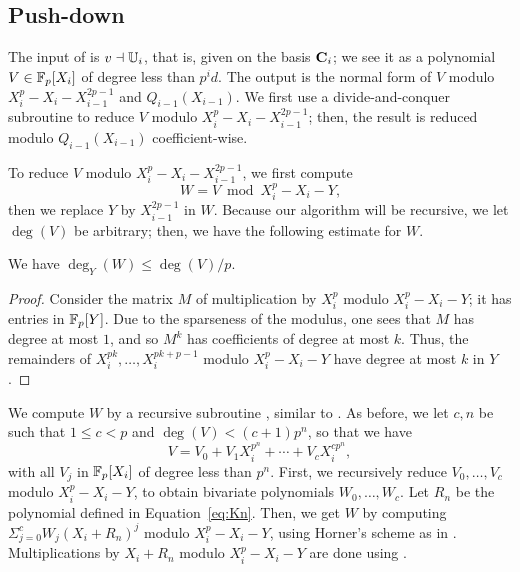 
\subsection{Push-down}\label{sec:level-embedding:push-down}

The input of \hyperref[alg:push-down]{} is $v \dashv \mathbb{U}_i$, that is, given on the
basis $\mathbf{C}_i$; we see it as a polynomial $V \in \mathbb{F}_p[X_i]$ of degree
less than $p^id$. The output is the normal form of $V$ modulo
$X_i^p-X_i-X_{i-1}^{2p-1}$ and $Q_{i-1}(X_{i-1})$. We first use a
divide-and-conquer subroutine to reduce $V$ modulo
$X_i^p-X_i-X_{i-1}^{2p-1}$; then, the result is reduced modulo
$Q_{i-1}(X_{i-1})$ coefficient-wise.

To reduce $V$ modulo $X_i^p-X_i-X_{i-1}^{2p-1}$, we first compute 
\begin{equation}
  \label{eq:91}
  W=V \bmod X_i^p-X_i-Y
  \text{,} 
\end{equation}
then we replace $Y$ by $X_{i-1}^{2p-1}$ in $W$.  Because our algorithm
will be recursive, we let $\deg(V)$ be arbitrary; then, we have the
following estimate for $W$.

\begin{lemma}
  \label{th:push-down-degree} We have $\deg_Y(W)\le \deg(V)/p$.
\end{lemma}
\begin{proof}
  Consider the matrix $M$ of multiplication by $X_i^p$ modulo
  $X_i^p-X_i-Y$; it has entries in $\mathbb{F}_p[Y]$. Due to the sparseness of
  the modulus, one sees that $M$ has degree at most $1$, and so $M^k$
  has coefficients of degree at most $k$. Thus, the remainders of
  $X_i^{pk},\dots,X_i^{pk+p-1}$ modulo $X_i^p-X_i-Y$ have degree at
  most $k$ in $Y$.
\end{proof}


We compute $W$ by a recursive subroutine \hyperref[alg:push-down-rec]{}, similar
to \hyperref[alg:compose]{}. As before, we let $c,n$ be such that $1\le c<p$ and
$\deg(V) < (c+1)p^n$, so that we have
$$V=V_0+ V_1X_i^{p^n}+\cdots+V_c X_i^{cp^n},$$ with all $V_j$ in
$\mathbb{F}_p[X_i]$ of degree less than $p^n$. First, we recursively reduce
$V_0,\dots,V_c$ modulo $X_i^p-X_i-Y$, to obtain bivariate
polynomials $W_0,\dots,W_{c}$. Let $R_n$ be the polynomial defined in
Equation~\eqref{eq:Kn}. Then, we get $W$ by computing
$\Sigma_{j=0}^c W_j(X_i+R_n)^j$ modulo $X_i^p-X_i-Y$,
using Horner's scheme as in \hyperref[alg:compose]{}. Multiplications by
$X_i+R_n$ modulo $X_i^p-X_i-Y$ are done using \hyperref[eq:89]{}.

